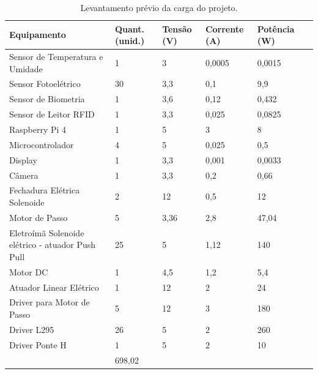 \begin{table}[htb]
    \centering
    \caption{Levantamento prévio da carga do projeto.}
    \label{fig:energia_carga}
    \begin{adjustbox}{max width = \textwidth}
        \begin{tabular}{|L{5cm}|C{2cm}|C{2cm}|C{2cm}|C{2cm}|C{2cm}|}
            \hline
            \textbf{Equipamento} & \textbf{Quant. (unid.)} & \textbf{Tensão (V)} & \textbf{Corrente (A)} & \textbf{Potência (W)} \\ \hline
            Sensor de Temperatura e Umidade & 1	 & 3 & 0,0005 & 0,0015
            \\ \hline
              Sensor Fotoelétrico & 30	 & 3,3 & 0,1 & 9,9
             \\ \hline
             Sensor de Biometria & 1 & 3,6 & 0,12 & 0,432
             \\ \hline
             Sensor de Leitor RFID & 1	 & 3,3 & 0,025 & 0,0825
             \\ \hline
              Raspberry Pi 4 & 1 & 5 & 3 & 8
             \\ \hline
               Microcontrolador & 4 & 5 & 0,025 & 0,5
             \\ \hline
               Display & 1 & 3,3 & 0,001 & 0,0033
             \\ \hline
               Câmera & 1 & 3,3 & 0,2 & 0,66
             \\ \hline
              Fechadura Elétrica Solenoide & 2 & 12 & 0,5 & 12
             \\ \hline
              Motor de Passo & 5 & 3,36 & 2,8 & 47,04
             \\ \hline
              Eletroímã Solenoide elétrico - atuador Push Pull & 25 & 5 & 1,12 & 140
             \\ \hline
                Motor DC & 1 & 4,5 & 1,2 & 5,4
             \\ \hline
                 Atuador Linear Elétrico & 1 & 12 & 2 & 24
             \\ \hline
               Driver para Motor de Passo & 5 & 12 & 3 & 180
             \\ \hline
                Driver L295 & 26 & 5 & 2 & 260
             \\ \hline
                  Driver Ponte H & 1 & 5 & 2 & 10
             \\ \hline
              & 698,02 \\
             \hline
        \end{tabular}
    \end{adjustbox}
\end{table}

